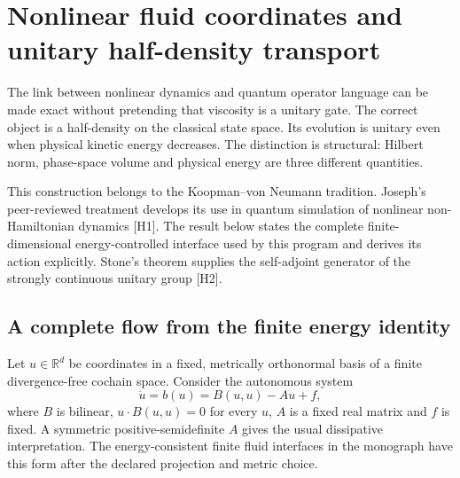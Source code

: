 \chapter{Nonlinear fluid coordinates and unitary half-density transport}
\label{ch:half-density}

The link between nonlinear dynamics and quantum operator language can be made exact without pretending that viscosity is a unitary gate. The correct object is a half-density on the classical state space. Its evolution is unitary even when physical kinetic energy decreases. The distinction is structural: Hilbert norm, phase-space volume and physical energy are three different quantities.

This construction belongs to the Koopman--von Neumann tradition. Joseph's peer-reviewed treatment develops its use in quantum simulation of nonlinear non-Hamiltonian dynamics [H1]. The result below states the complete finite-dimensional energy-controlled interface used by this program and derives its action explicitly. Stone's theorem supplies the self-adjoint generator of the strongly continuous unitary group [H2].

\section{A complete flow from the finite energy identity}

Let $u\in\mathbb R^d$ be coordinates in a fixed, metrically orthonormal basis of a finite divergence-free cochain space. Consider the autonomous system
\[
 \dot u=b(u)=B(u,u)-Au+f,
\]
where $B$ is bilinear, $u\cdot B(u,u)=0$ for every $u$, $A$ is a fixed real matrix and $f$ is fixed. A symmetric positive-semidefinite $A$ gives the usual dissipative interpretation. The energy-consistent finite fluid interfaces in the monograph have this form after the declared projection and metric choice.

